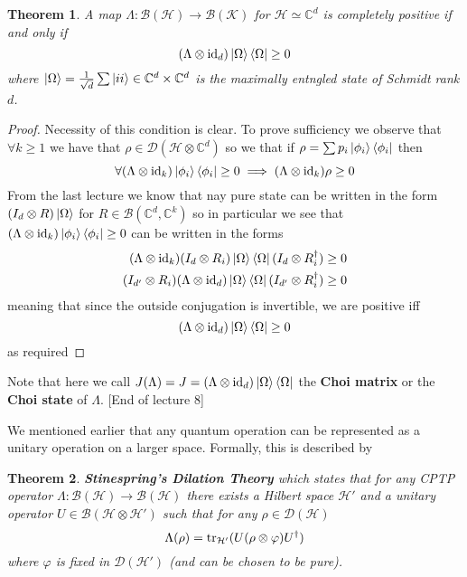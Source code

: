 \documentclass{article}
\newtheorem{theorem}{Theorem}
\theoremstyle{definition}
\newcommand{\id}{\text{id}}
\begin{document}
\begin{theorem}
  A map $\Lambda : \mathcal{B}(\mathcal{H}) \to \mathcal{B}(\mathcal{K})$ for 
  $\mathcal{H} \simeq \mathbb{C}^d$ is completely positive if and only if
  $$ (\Lambda \otimes \id_d) \ket{\Omega} \bra{\Omega} \geq 0 $$
  where $\ket{\Omega} = \frac{1}{\sqrt{d}} \sum \ket{ii} \in \mathbb{C}^d \times
  \mathbb{C}^d$ is the maximally entngled state of Schmidt rank $d$.
\end{theorem}
\begin{proof}
  Necessity of this condition is clear. To prove sufficiency we observe that 
  $\forall k \geq 1$ we have that $\rho \in \mathcal{D}(\mathcal{H} \otimes 
  \mathbb{C}^d)$ so we that if $\rho = \sum p_i \ket{\phi_i} \bra{\phi_i}$ then
  $$ \forall (\Lambda \otimes \id_k) \ket{\phi_i} \bra{\phi_i} \geq 0
  \implies (\Lambda \otimes \id_k) \rho \geq 0 $$
  From the last lecture we know that nay pure state can be written in the form
  $(I_d \otimes R) \ket{\Omega}$ for $R \in \mathcal{B}(\mathbb{C}^d, 
  \mathbb{C}^k)$ so in particular we see that $(\Lambda \otimes \id_k)
  \ket{\phi_i} \bra{\phi_i} \geq 0$ can be written in the forms
  \begin{align*}
    (\Lambda \otimes \id_k) (I_d \otimes R_i) \ket{\Omega} \bra{\Omega}
    (I_d \otimes R_i^\dagger) &\geq 0 \\
    (I_{d'} \otimes R_i) (\Lambda \otimes \id_d) \ket{\Omega} \bra{\Omega}
    (I_{d'} \otimes R_i^\dagger) &\geq 0
  \end{align*}
  meaning that since the outside conjugation is invertible, we are positive iff
  $$ (\Lambda \otimes \id_d) \ket{\Omega} \bra{\Omega} \geq 0 $$
  as required
\end{proof}
Note that here we call $J(\Lambda) = J = (\Lambda \otimes \id_d) \ket{\Omega}
\bra{\Omega}$ the \textbf{Choi matrix} or the \textbf{Choi state} of $\Lambda$.
[End of lecture 8]

We mentioned earlier that any quantum operation can be represented as a unitary
operation on a larger space. Formally, this is described by

\begin{theorem}
  \textbf{Stinespring's Dilation Theory} which states that for any CPTP operator
  $\Lambda: \mathcal{B(H)} \to \mathcal{B(H)}$ there exists 
  a Hilbert space $\mathcal{H'}$ and a unitary operator $U \in \mathcal{B(H 
  \otimes H')}$ such that for any $\rho \in \mathcal{D(H)}$
  \begin{equation}
    \Lambda(\rho) = \tr_{\mathcal{H}'}(U(\rho \otimes \varphi) U^\dagger)
  \end{equation}
  where $\varphi$ is fixed in $\mathcal{D(H')}$ (and can be chosen to be pure).
\end{theorem}
\end{document}
